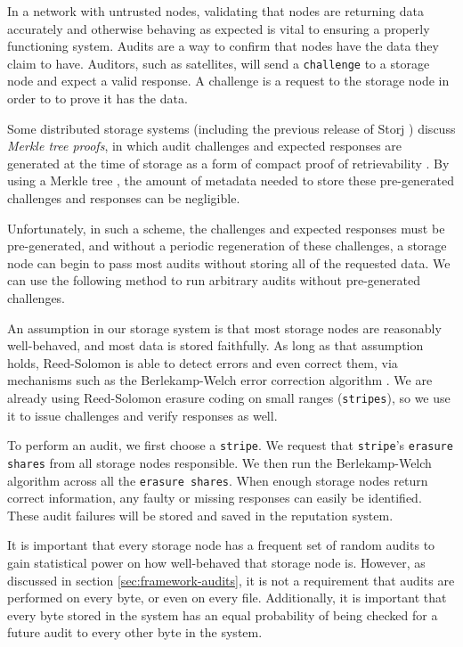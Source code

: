 \documentclass[11pt,fleqn,openany]{book}
\newcommand{\x}[1]{{\tt #1}} \newcommand{\code}[1]{{\em #1}}
\begin{document}
In a network with untrusted nodes, validating that nodes are returning data
accurately and otherwise behaving as expected is vital to ensuring a properly
functioning system. Audits are a way to confirm that nodes have the data they
claim to have. Auditors, such as satellites, will send a \x{challenge} to a
storage node and expect a valid response. A challenge is a request to the
storage node in order to to prove it has the data.

Some distributed storage systems (including the previous release of Storj
\cite{storj-v2}) discuss {\em Merkle tree proofs}, in which audit challenges
and expected responses are generated at the time of storage as a form of compact
proof of retrievability \cite{proof-of-retrievability}. By using a Merkle tree
\cite{merkle-tree}, the amount of metadata needed to store these pre-generated
challenges and responses can be negligible.

Unfortunately, in such a scheme, the challenges and expected responses must be
pre-generated, and without a periodic regeneration of these challenges, a
storage node can begin to pass most audits without storing all of the requested
data. We can use the following method to run arbitrary audits without
pre-generated challenges.

An assumption in our storage system is that most storage nodes are
reasonably well-behaved, and most data is stored faithfully. As long as that
assumption holds, Reed-Solomon is able to detect errors and even correct them,
via mechanisms such as the Berlekamp-Welch error correction algorithm \cite{bw}.
We are already using Reed-Solomon erasure coding
\cite{rs} on small ranges (\x{stripes}), so we use it to issue challenges and
verify responses as well.

To perform an audit, we first choose a \x{stripe}. We request that
\x{stripe}'s \x{erasure shares} from all storage nodes responsible. We then run
the Berlekamp-Welch algorithm \cite{bw} across all the \x{erasure shares}. When
enough storage nodes return correct information, any faulty or missing responses
can easily be identified. These audit failures will be stored and saved in the
reputation system.

It is important that every storage node has a frequent set of random audits to
gain statistical power on how well-behaved that storage node is. However, as
discussed in section \ref{sec:framework-audits}, it is
not a requirement that audits are performed on every byte, or even on every
file.
Additionally, it is important that every byte stored in the system has an equal
probability of being checked for a future audit to every other byte in the
system.
\end{document}
